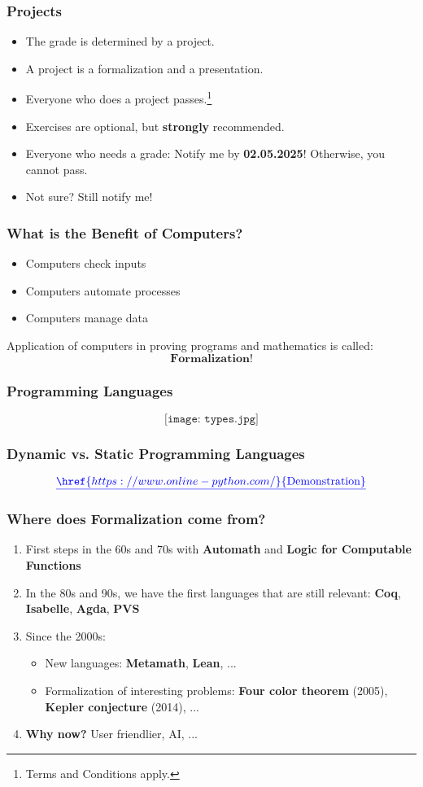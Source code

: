 \documentclass{beamer}
\theoremstyle{definition}
\theoremstyle{remark}
\begin{document}
\begin{frame}
	\frametitle{Projects}
	\begin{itemize}
		\item The grade is determined by a project.
		\item A project is a formalization and a presentation.
		\item Everyone who does a project passes.\footnote{Terms and Conditions apply.}
		\item Exercises are optional, but \textbf{strongly} recommended.
		\item Everyone who needs a grade: Notify me by \textbf{02.05.2025}! Otherwise, you cannot pass.
		\item Not sure? Still notify me!
	\end{itemize}
\end{frame}

\begin{frame}
 \frametitle{What is the Benefit of Computers?}
	\begin{itemize}
		\item Computers check inputs
		\item Computers automate processes
		\item Computers manage data \vspace{1cm}
	\end{itemize}
	Application of computers in proving programs and mathematics is called:
	\[\textbf{Formalization}!\]
\end{frame}

\begin{frame}
	\frametitle{Programming Languages}
 \[\texttt{[image: types.jpg]}\]
\end{frame}

\begin{frame}
	\frametitle{Dynamic vs. Static Programming Languages}
	\[
		{\color{blue}\underline{\href{https://www.online-python.com/}{\text{Demonstration}}}}
	\]
\end{frame}

\begin{frame}
	\frametitle{Where does Formalization come from?}
	\begin{enumerate}
		\item First steps in the 60s and 70s with \textbf{Automath} and \textbf{Logic for Computable Functions} 
		\item In the 80s and 90s, we have the first languages that are still relevant: \textbf{Coq}, \textbf{Isabelle}, \textbf{Agda}, \textbf{PVS}
		\item Since the 2000s: 
		\begin{itemize}
		 \item New languages: \textbf{Metamath}, \textbf{Lean}, ...
		 \item Formalization of interesting problems: \textbf{Four color theorem} (2005), \textbf{Kepler conjecture} (2014), ...
		\end{itemize}
	 \item \textbf{Why now?} User friendlier, AI, ... 
	\end{enumerate}
\end{frame}
\end{document}
